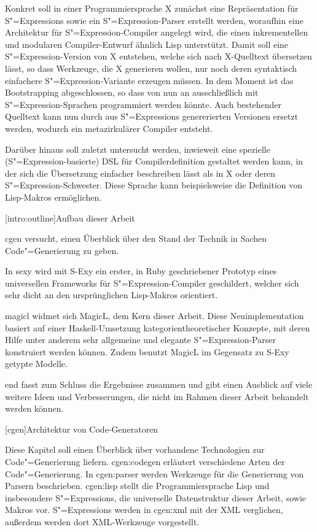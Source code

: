 \documentclass[a4paper, bibgerm]{book}
\newcommand\lchapter{}
\newcommand\lsection{}
\newcommand\cref{}
\newcommand\sref{}
\newcommand{\sexy}{S-Exy}
\newcommand{\sexp}{S"=Expression}
\newcommand{\sexps}{S"=Expressions}
\newcommand{\cgen}{Code"=Generierung}
\begin{document}
Konkret soll in einer Programmiersprache X zunächst eine Repräsentation
für \sexps{} sowie ein \sexp{}-Parser erstellt werden, woraufhin eine
Architektur für \sexp{}-Compiler angelegt wird, die einen inkrementellen
und modularen Compiler-Entwurf ähnlich Lisp unterstützt. Damit soll eine
\sexp{}-Version von X entstehen, welche sich nach X-Quelltext übersetzen
lässt, so dass Werkzeuge, die X generieren wollen, nur noch deren
syntaktisch einfachere \sexp{}-Variante erzeugen müssen. In dem Moment ist
das Bootstrapping abgeschlossen, so dass von nun an ausschließlich mit
\sexp{}-Sprachen programmiert werden könnte. Auch bestehender Quelltext
kann nun durch aus \sexps{} genererierten Versionen ersetzt werden,
wodurch ein metazirkulärer Compiler entsteht.

Darüber hinaus soll zuletzt untersucht werden, inwieweit eine spezielle
(\sexp{}-basierte) DSL für Compilerdefinition gestaltet werden kann, in
der sich die Übersetzung einfacher beschreiben lässt als in X
oder deren \sexp{}-Schwester. Diese Sprache kann beispielsweise die
Definition von Lisp-Makros ermöglichen.

\lsection[intro:outline]{Aufbau dieser Arbeit}

\cref{cgen} versucht, einen Überblick über den Stand der Technik in
Sachen \cgen{} zu geben.

In \cref{sexy} wird mit \sexy{} ein erster, in Ruby geschriebener Prototyp eines
universellen Frameworks für \sexp{}-Compiler geschildert, welcher
sich sehr dicht an den ursprünglichen Lisp-Makros
orientiert.

\cref{magicl} widmet sich MagicL, dem Kern dieser Arbeit. Diese
Neuimplementation basiert auf einer Haskell-Umsetzung
kategorientheoretischer Konzepte, mit deren Hilfe unter anderem sehr
allgemeine und elegante \sexp{}-Parser konstruiert werden
können. Zudem benutzt MagicL im Gegensatz zu \sexy{} getypte Modelle.

\cref{end} fasst zum Schluss die Ergebnisse zusammen und gibt
einen Ausblick auf viele weitere Ideen und Verbesserungen, die nicht im
Rahmen dieser Arbeit behandelt werden können.

\lchapter[cgen]{Architektur von Code-Generatoren}

Diese Kapitel soll einen Überblick über vorhandene Technologien zur
\cgen{} liefern.  \sref{cgen:codegen} erläutert verschiedene
Arten der \cgen{}. In \sref{cgen:parser} werden Werkzeuge für
die Generierung von Parsern beschrieben. \sref{cgen:lisp} stellt die
Programmiersprache Lisp und insbesondere \sexps{}, die universelle
Datenstruktur dieser Arbeit, sowie Makros vor. \sexps{} werden in
\sref{cgen:xml} mit der XML verglichen, außerdem werden dort
XML-Werkzeuge vorgestellt.
\end{document}
